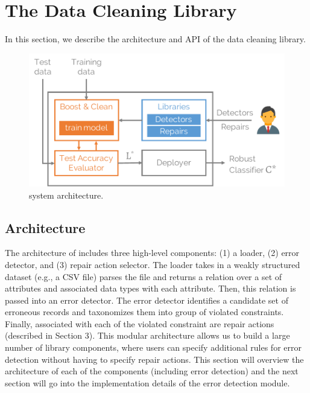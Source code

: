 \section{The Data Cleaning Library}
 In this section, we describe the architecture and API of the data cleaning library. 
 
\begin{figure}[h]
\centering
\includegraphics[width=0.8\columnwidth]{figures/arch.pdf}
\caption{\sys system architecture.}
\label{f:arch}
\end{figure}

\subsection{Architecture}
The architecture of \sys includes three high-level components: (1) a loader, (2) error detector, and (3) repair action selector.
The loader takes in a weakly structured dataset (e.g., a CSV file) parses the file and returns a relation over a set of attributes and associated data types with each attribute.
Then, this relation is passed into an error detector.
The error detector identifies a candidate set of erroneous records and taxonomizes them into group of violated constraints.
Finally, associated with each of the violated constraint are repair actions (described in Section 3).
This modular architecture allows us to build a large number of library components, where users can specify additional rules for error detection without having to specify repair actions.
This section will overview the architecture of each of the components (including error detection) and the next section will go into the implementation details of the error detection module.

